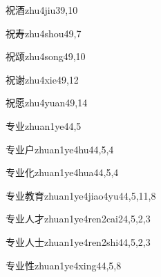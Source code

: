 \begin{entry}{祝酒}{zhu4jiu3}{9,10}
\end{entry}

\begin{entry}{祝寿}{zhu4shou4}{9,7}
\end{entry}

\begin{entry}{祝颂}{zhu4song4}{9,10}
\end{entry}

\begin{entry}{祝谢}{zhu4xie4}{9,12}
\end{entry}

\begin{entry}{祝愿}{zhu4yuan4}{9,14}
\end{entry}

\begin{entry}{专业}{zhuan1ye4}{4,5}
\end{entry}

\begin{entry}{专业户}{zhuan1ye4hu4}{4,5,4}
\end{entry}

\begin{entry}{专业化}{zhuan1ye4hua4}{4,5,4}
\end{entry}

\begin{entry}{专业教育}{zhuan1ye4jiao4yu4}{4,5,11,8}
\end{entry}

\begin{entry}{专业人才}{zhuan1ye4ren2cai2}{4,5,2,3}
\end{entry}

\begin{entry}{专业人士}{zhuan1ye4ren2shi4}{4,5,2,3}
\end{entry}

\begin{entry}{专业性}{zhuan1ye4xing4}{4,5,8}
\end{entry}

